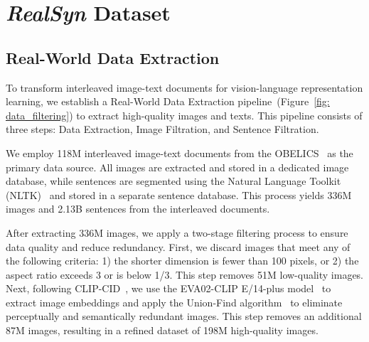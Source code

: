 \section{\textit{RealSyn} Dataset}

\subsection{Real-World Data Extraction}
To transform interleaved image-text documents for vision-language representation learning, we establish a Real-World Data Extraction pipeline~(Figure~\ref{fig: data_filtering}) to extract high-quality images and texts. This pipeline consists of three steps: Data Extraction, Image Filtration, and Sentence Filtration.

 We employ 118M interleaved image-text documents from the OBELICS~\cite{Obelics} as the primary data source. All images are extracted and stored in a dedicated image database, while sentences are segmented using the Natural Language Toolkit (NLTK)~\cite{nltk} and stored in a separate sentence database. This process yields 336M images and 2.13B sentences from the interleaved documents.

After extracting 336M images, we apply a two-stage filtering process to ensure data quality and reduce redundancy. First, we discard images that meet any of the following criteria: 1) the shorter dimension is fewer than 100 pixels, or 2) the aspect ratio exceeds 3 or is below 1/3. This step removes 51M low-quality images. Next, following CLIP-CID~\cite{CLIP_CID}, we use the EVA02-CLIP E/14-plus model~\cite{eva_clip} to extract image embeddings and apply the Union-Find algorithm~\cite{union_find} to eliminate perceptually and semantically redundant images. This step removes an additional 87M images, resulting in a refined dataset of 198M high-quality images.



